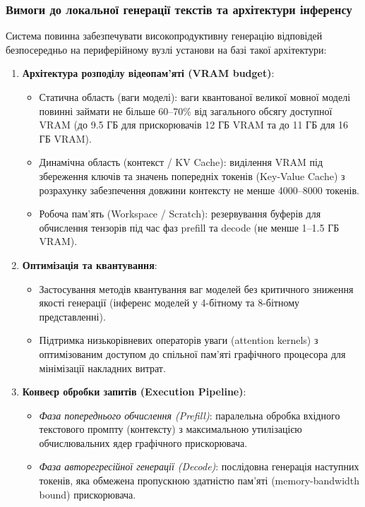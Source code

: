\documentclass{article}
\begin{document}
\subsubsection{Вимоги до локальної генерації текстів та архітектури інференсу}
Система повинна забезпечувати високопродуктивну генерацію відповідей безпосередньо на периферійному вузлі установи на базі такої архітектури:
\begin{enumerate}
    \item \textbf{Архітектура розподілу відеопам'яті (VRAM budget)}:
    \begin{itemize}
        \item Статична область (ваги моделі): ваги квантованої великої мовної моделі повинні займати не більше 60--70\% від загального обсягу доступної VRAM (до 9.5 ГБ для прискорювачів 12 ГБ VRAM та до 11 ГБ для 16 ГБ VRAM).
        \item Динамічна область (контекст / KV Cache): виділення VRAM під збереження ключів та значень попередніх токенів (Key-Value Cache) з розрахунку забезпечення довжини контексту не менше 4000--8000 токенів.
        \item Робоча пам'ять (Workspace / Scratch): резервування буферів для обчислення тензорів під час фаз prefill та decode (не менше 1--1.5 ГБ VRAM).
    \end{itemize}
    
    \item \textbf{Оптимізація та квантування}:
    \begin{itemize}
        \item Застосування методів квантування ваг моделей без критичного зниження якості генерації (інференс моделей у 4-бітному та 8-бітному представленні).
        \item Підтримка низькорівневих операторів уваги (attention kernels) з оптимізованим доступом до спільної пам'яті графічного процесора для мінімізації накладних витрат.
    \end{itemize}

    \item \textbf{Конвеєр обробки запитів (Execution Pipeline)}:
    \begin{itemize}
        \item \textit{Фаза попереднього обчислення (Prefill)}: паралельна обробка вхідного текстового промпту (контексту) з максимальною утилізацією обчислювальних ядер графічного прискорювача.
        \item \textit{Фаза авторегресійної генерації (Decode)}: послідовна генерація наступних токенів, яка обмежена пропускною здатністю пам'яті (memory-bandwidth bound) прискорювача.
    \end{itemize}


\end{enumerate}
\end{document}
